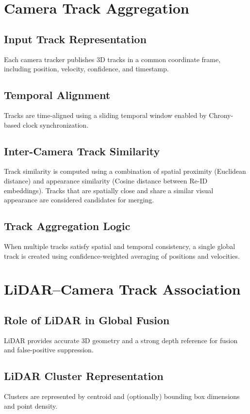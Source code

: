 \documentclass[12pt,a4paper]{report}
\begin{document}
\section{Camera Track Aggregation}
\subsection{Input Track Representation}
Each camera tracker publishes 3D tracks in a common coordinate frame, including position, velocity, confidence, and timestamp.

\subsection{Temporal Alignment}
Tracks are time-aligned using a sliding temporal window enabled by Chrony-based clock synchronization.

\subsection{Inter-Camera Track Similarity}
Track similarity is computed using a combination of spatial proximity (Euclidean distance) and appearance similarity (Cosine distance between Re-ID embeddings). Tracks that are spatially close and share a similar visual appearance are considered candidates for merging.

\subsection{Track Aggregation Logic}
When multiple tracks satisfy spatial and temporal consistency, a single global track is created using confidence-weighted averaging of positions and velocities.

\section{LiDAR--Camera Track Association}
\subsection{Role of LiDAR in Global Fusion}
LiDAR provides accurate 3D geometry and a strong depth reference for fusion and false-positive suppression.

\subsection{LiDAR Cluster Representation}
Clusters are represented by centroid and (optionally) bounding box dimensions and point density.
\end{document}
